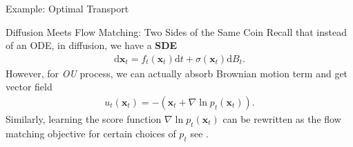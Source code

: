 \documentclass{beamer}
\begin{document}
\begin{frame}{Example: Optimal Transport}
\end{frame}

\begin{frame}{Diffusion Meets Flow Matching: Two Sides of the Same Coin \cite{gaoDiffusionMeetsFlow2024}}
    Recall that instead of an ODE, in diffusion, we have a \textbf{SDE}
    \begin{align*}
        \mathrm{d}\mathbf{x}_t = f_t(\mathbf{x}_t)\mathrm{d}t + \sigma(\mathbf{x}_t) \mathrm{d}B_t
    .\end{align*}
    However, for \emph{OU} process, we can actually absorb Brownian motion term and get vector field
    \begin{align*}
        u_t(\mathbf{x}_t) = -(\mathbf{x}_t + \nabla \ln p_t(\mathbf{x}_t))
    .\end{align*}
    Similarly, learning the score function \( \nabla \ln p_t(\mathbf{x}_t) \) can be rewritten as the flow matching objective for certain choices of \( p_t \) see \cite{lipmanFlowMatchingGuide2024a}.
\end{frame}
\end{document}
